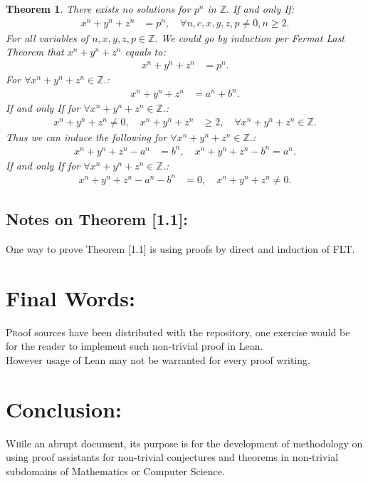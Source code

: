\documentclass[10pt]{article}
\theoremstyle{plain}
\newtheorem{theorem}{Theorem}[section]
\theoremstyle{definition}
\theoremstyle{remark}
\begin{document}
	\begin{theorem}
		There exists no solutions for $p^{n}$ in $\mathbb{Z}.$ If and only If:
		\begin{align*}
			x^{n} + y^{n} + z^{n} &= p^{n}, \quad \forall n, c, x, y, z, p \neq 0, n \geq 2.
		\end{align*}
		For all variables of $n, x, y, z, p \in \mathbb{Z}.$ We could go by induction per Fermat Last Theorem that $x^{n} + y^{n} + z^{n}$ equals to:	
		\begin{align*}
			x^{n} + y^{n} + z^{n} &= p^{n}.
		\end{align*}
		For $\forall x^{n} + y^{n} + z^{n} \in \mathbb{Z}.$:
		\begin{align*}
			x^{n} + y^{n} + z^{n} &= a^{n} + b^{n}.
		\end{align*}
		If and only If for $\forall x^{n} + y^{n} + z^{n} \in \mathbb{Z}.$:
		\begin{align*}
			x^{n} + y^{n} + z^{n} \neq 0, \quad x^{n} + y^{n} + z^{n} &\geq 2, \quad \forall x^{n} + y^{n} + z^{n} \in \mathbb{Z}.
		\end{align*}
		Thus we can induce the following for $\forall x^{n} + y^{n} + z^{n} \in \mathbb{Z}.$:
		\begin{align*}
			x^{n} + y^{n} + z^{n} -  a^{n} &= b^{n}, \quad x^{n} + y^{n} + z^{n} - b^{n} = a^{n}.
		\end{align*}
		If and only If for $\forall x^{n} + y^{n} + z^{n} \in \mathbb{Z}.$:
		\begin{align*}
			x^{n} + y^{n} + z^{n} -  a^{n} - b^{n} &= 0, \quad x^{n} + y^{n} + z^{n} \neq 0.
		\end{align*}
	\end{theorem}
	\subsection{Notes on Theorem [1.1]:}
	One way to prove Theorem [1.1] is using proofs by direct and induction of FLT.
	\section{Final Words:}
	\lettrine[lines=1, lhang=0.1, loversize=0.2]{P}roof sources have been distributed with the repository, one exercise would be for the reader to implement such non-trivial proof in Lean.\\However usage of Lean may not be warranted for every proof writing.
	\section{Conclusion:}
	\lettrine[lines=1, lhang=0.1, loversize=0.2]{W}hile an abrupt document, its purpose is for the development of methodology on using proof assistants for non-trivial conjectures and theorems in non-trivial subdomains of Mathematics or Computer Science.
	
\nocite{*}
	


	
	
\end{document}
